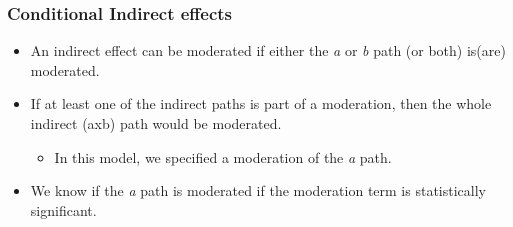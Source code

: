 \documentclass[
]{book}
\providecommand{\tightlist}{%
  \setlength{\itemsep}{0pt}\setlength{\parskip}{0pt}}
\begin{document}
\hypertarget{conditional-indirect-effects}{%
\subsubsection{Conditional Indirect effects}\label{conditional-indirect-effects}}

\begin{itemize}
\tightlist
\item
  An indirect effect can be moderated if either the \emph{a} or \emph{b} path (or both) is(are) moderated.
\item
  If at least one of the indirect paths is part of a moderation, then the whole indirect (axb) path would be moderated.

  \begin{itemize}
  \tightlist
  \item
    In this model, we specified a moderation of the \emph{a} path.
  \end{itemize}
\item
  We know if the \emph{a} path is moderated if the moderation term is statistically significant.


\end{itemize}
\end{document}
